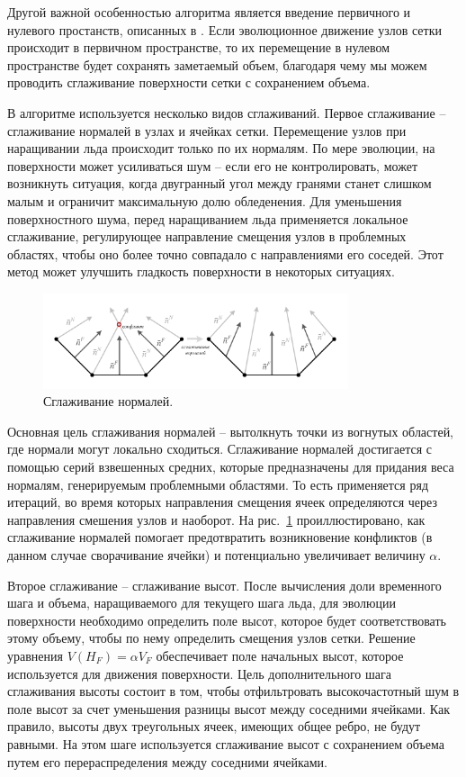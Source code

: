 Другой важной особенностью алгоритма является введение первичного и нулевого простанств, описанных в \cite{Jiao2006Smooth}.
Если эволюционное движение узлов сетки происходит в первичном пространстве, то их перемещение в нулевом пространстве будет сохранять заметаемый объем, благодаря чему мы можем  проводить сглаживание поверхности сетки с сохранением объема.

В алгоритме используется несколько видов сглаживаний.
Первое сглаживание -- сглаживание нормалей в узлах и ячейках сетки.
Перемещение узлов при наращивании льда происходит только по их нормалям.
По мере эволюции, на поверхности может усиливаться шум -- если его не контролировать, может возникнуть ситуация, когда двугранный угол между гранями станет слишком малым и ограничит максимальную долю обледенения.
Для уменьшения поверхностного шума, перед наращиванием льда применяется локальное сглаживание, регулирующее направление смещения узлов в проблемных областях, чтобы оно более точно совпадало с направлениями его соседей.
Этот метод может улучшить гладкость поверхности в некоторых ситуациях.

\begin{figure}[ht]
\centering
\includegraphics[width=0.8\textwidth]{fig/3dr_normals_smooth.pdf}
\singlespacing
{}\caption{Сглаживание нормалей.}
\label{fig:text_1_remesh3_normals_smooth}
\end{figure}

Основная цель сглаживания нормалей -- вытолкнуть точки из вогнутых областей, где нормали могут локально сходиться.
Сглаживание нормалей достигается с помощью серий взвешенных средних, которые предназначены для придания веса нормалям, генерируемым проблемными областями.
То есть применяется ряд итераций, во время которых направления смещения ячеек определяются через направления смешения узлов и наоборот.
На рис.~\ref{fig:text_1_remesh3_normals_smooth} проиллюстировано, как сглаживание нормалей помогает предотвратить возникновение конфликтов (в данном случае сворачивание ячейки) и потенциально увеличивает величину $\alpha$.

Второе сглаживание -- сглаживание высот.
После вычисления доли временного шага и объема, наращиваемого для текущего шага льда, для эволюции поверхности необходимо определить поле высот, которое будет соответствовать этому объему, чтобы по нему определить смещения узлов сетки.
Решение уравнения $V(H_F) = \alpha V_F$ обеспечивает поле начальных высот, которое используется для движения поверхности.
Цель дополнительного шага сглаживания высоты состоит в том, чтобы отфильтровать высокочастотный шум в поле высот за счет уменьшения разницы высот между соседними ячейками.
Как правило, высоты двух треугольных ячеек, имеющих общее ребро, не будут равными.
На этом шаге используется сглаживание высот с сохранением объема путем его перераспределения между соседними ячейками.

